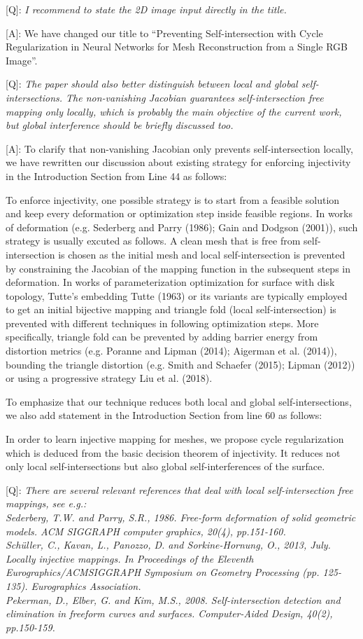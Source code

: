 \documentclass[10pt]{letter} %
\newcommand{\mdf}[1]{\textcolor[rgb]{1.00,0.00,1.00}{#1}}
\begin{document}
	[Q]: \emph{I recommend to state the 2D image input directly in the title.}
	
	[A]: We have changed our title to ``Preventing Self-intersection with Cycle Regularization \mdf{in Neural Networks for Mesh Reconstruction from a Single RGB Image}''.
	
	[Q]: \emph{The paper should also better distinguish between local and global self-intersections. The non-vanishing Jacobian guarantees self-intersection free mapping only locally, which is probably the main objective of the current work, but global interference should be briefly discussed too.}
	
	[A]: To clarify that non-vanishing Jacobian only prevents self-intersection locally, we have rewritten our discussion about existing strategy for enforcing injectivity in the Introduction Section from Line 44 as follows:
	
	\mdf{To enforce injectivity, one possible strategy is to start from a feasible solution and keep every deformation or optimization step inside feasible regions. In works of deformation (e.g. Sederberg and Parry (1986); Gain and Dodgson (2001)), such strategy is usually excuted as follows. A clean mesh that is free from self-intersection is chosen as the initial mesh and local self-intersection is prevented by constraining the Jacobian of the mapping function in the subsequent steps in deformation. In works of parameterization optimization for surface with disk topology, Tutte’s embedding Tutte (1963) or its variants are typically employed to get an initial bijective mapping and triangle fold (local self-intersection) is prevented with different techniques in following optimization steps. More specifically, triangle fold can be prevented by adding barrier energy from distortion metrics (e.g. Poranne and Lipman (2014); Aigerman et al. (2014)), bounding the triangle distortion (e.g. Smith and Schaefer (2015); Lipman (2012)) or using a progressive strategy Liu et al. (2018).}
	
	To emphasize that our technique reduces both local and global self-intersections, we also add statement in the Introduction Section from line 60 as follows:
	
	In order to learn injective mapping for meshes, \mdf{we propose cycle regularization which is deduced from the basic decision theorem of injectivity. It reduces not only local self-intersections but also global self-interferences of the surface.}
	
	[Q]: 
	\emph{There are several relevant references that deal with local self-intersection free mappings, see e.g.:\\
	Sederberg, T.W. and Parry, S.R., 1986. Free-form deformation of solid geometric models. ACM SIGGRAPH computer graphics, 20(4), pp.151-160.\\
	Schüller, C., Kavan, L., Panozzo, D. and Sorkine-Hornung, O., 2013, July. Locally injective mappings. In Proceedings of the Eleventh Eurographics/ACMSIGGRAPH Symposium on Geometry Processing (pp. 125-135). Eurographics Association.\\
	Pekerman, D., Elber, G. and Kim, M.S., 2008. Self-intersection detection and elimination in freeform curves and surfaces. Computer-Aided Design, 40(2), pp.150-159.}
\end{document}
